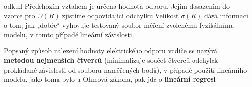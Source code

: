       odkud
      Předchozím vztahem je určena hodnota odporu. Jejím dosazením do vzorce pro \(D(R)\) zjistíme
      odpovídající odchylku
      Velikost \(\sigma(R)\) dává informaci o tom, jak „dobře“ vyhovuje testovaný soubor měření 
      zvolenému fyzikálnímu modelu, v tomto případě lineární závislosti.

      
      
      Popsaný způsob nalezení hodnoty elektrického odporu vodiče se nazývá\textbf{ metodou 
      nejmenších čtverců} (minimalizuje součet čtverců odchylek prokládané závislosti od souboru 
      naměřených bodů), v případě použití lineárního modelu, jako tomu bylo u Ohmová zákona, pak 
      jde o \textbf{lineární regresi}
      
